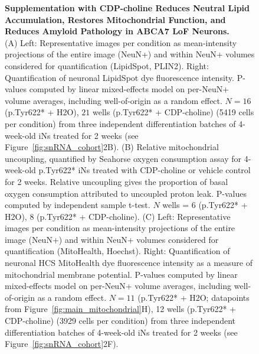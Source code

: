 
\clearpage


\clearpage


\clearpage


\clearpage

% 


\begin{figure}[ht]
    \centering
    \caption{
        \textbf{Supplementation with CDP-choline Reduces Neutral Lipid Accumulation, Restores Mitochondrial Function, and Reduces Amyloid Pathology in ABCA7 LoF Neurons.}\\[1ex]
        (A) Left: Representative images per condition as mean-intensity projections of the entire image (NeuN+) and within NeuN+ volumes considered for quantification (LipidSpot, PLIN2). Right: Quantification of neuronal LipidSpot dye fluorescence intensity. P-values computed by linear mixed-effects model on per-NeuN+ volume averages, including well-of-origin as a random effect. $N = 16$ (p.Tyr622* + H2O), $21$ wells (p.Tyr622* + CDP-choline) (5419 cells per condition) from three independent differentiation batches of 4-week-old iNs treated for 2 weeks (see Figure~\ref{fig:snRNA_cohort}2B). 
        (B) Relative mitochondrial uncoupling, quantified by Seahorse oxygen consumption assay for 4-week-old p.Tyr622* iNs treated with CDP-choline or vehicle control for 2 weeks. Relative uncoupling gives the proportion of basal oxygen consumption attributed to uncoupled proton leak. P-values computed by independent sample t-test. $N$ wells = 6 (p.Tyr622* + H2O), 8 (p.Tyr622* + CDP-choline). 
        (C) Left: Representative images per condition as mean-intensity projections of the entire image (NeuN+) and within NeuN+ volumes considered for quantification (MitoHealth, Hoechst). Right: Quantification of neuronal HCS MitoHealth dye fluorescence intensity as a measure of mitochondrial membrane potential. P-values computed by linear mixed-effects model on per-NeuN+ volume averages, including well-of-origin as a random effect. $N = 11$ (p.Tyr622* + H2O; datapoints from Figure~\ref{fig:main_mitochondrial}H), 12 wells (p.Tyr622* + CDP-choline) (3929 cells per condition) from three independent differentiation batches of 4-week-old iNs treated for 2 weeks (see Figure~\ref{fig:snRNA_cohort}2F). 
}
\end{figure}
